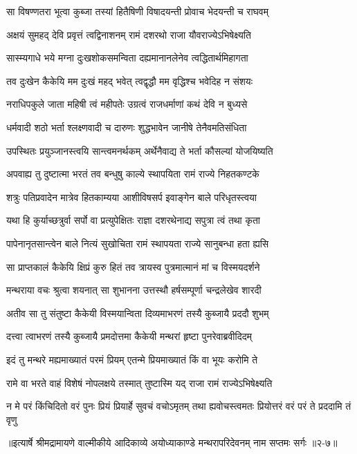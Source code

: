\twolineshloka
{सा विषण्णतरा भूत्वा कुब्जा तस्यां हितैषिणी}
{विषादयन्ती प्रोवाच भेदयन्ती च राघवम्} %

\twolineshloka
{अक्षयं सुमहद् देवि प्रवृत्तं त्वद्विनाशनम्}
{रामं दशरथो राजा यौवराज्येऽभिषेक्ष्यति} %

\twolineshloka
{सास्म्यगाधे भये मग्ना दुःखशोकसमन्विता}
{दह्यमानानलेनेव त्वद्धितार्थमिहागता} %

\twolineshloka
{तव दुःखेन कैकेयि मम दुःखं महद् भवेत्}
{त्वद्वृद्धौ मम वृद्धिश्च भवेदिह न संशयः} %

\twolineshloka
{नराधिपकुले जाता महिषी त्वं महीपतेः}
{उग्रत्वं राजधर्माणां कथं देवि न बुध्यसे} %

\twolineshloka
{धर्मवादी शठो भर्ता श्लक्ष्णवादी च दारुणः}
{शुद्धभावेन जानीषे तेनैवमतिसंधिता} %

\twolineshloka
{उपस्थितः प्रयुञ्जानस्त्वयि सान्त्वमनर्थकम्}
{अर्थेनैवाद्य ते भर्ता कौसल्यां योजयिष्यति} %

\twolineshloka
{अपवाह्य तु दुष्टात्मा भरतं तव बन्धुषु}
{काल्ये स्थापयिता रामं राज्ये निहतकण्टके} %

\twolineshloka
{शत्रुः पतिप्रवादेन मात्रेव हितकाम्यया}
{आशीविषसर्प इवाङ्गेन बाले परिधृतस्त्वया} %

\twolineshloka
{यथा हि कुर्याच्छत्रुर्वा सर्पो वा प्रत्युपेक्षितः}
{राज्ञा दशरथेनाद्य सपुत्रा त्वं तथा कृता} %

\twolineshloka
{पापेनानृतसान्त्वेन बाले नित्यं सुखोचिता}
{रामं स्थापयता राज्ये सानुबन्धा हता ह्यसि} %

\twolineshloka
{सा प्राप्तकालं कैकेयि क्षिप्रं कुरु हितं तव}
{त्रायस्व पुत्रमात्मानं मां च विस्मयदर्शने} %

\twolineshloka
{मन्थराया वचः श्रुत्वा शयनात् सा शुभानना}
{उत्तस्थौ हर्षसम्पूर्णा चन्द्रलेखेव शारदी} %

\twolineshloka
{अतीव सा तु संतुष्टा कैकेयी विस्मयान्विता}
{दिव्यमाभरणं तस्यै कुब्जायै प्रददौ शुभम्} %

\twolineshloka
{दत्त्वा त्वाभरणं तस्यै कुब्जायै प्रमदोत्तमा}
{कैकेयी मन्थरां हृष्टा पुनरेवाब्रवीदिदम्} %

\twolineshloka
{इदं तु मन्थरे मह्यमाख्यातं परमं प्रियम्}
{एतन्मे प्रियमाख्यातं किं वा भूयः करोमि ते} %

\twolineshloka
{रामे वा भरते वाहं विशेषं नोपलक्षये}
{तस्मात् तुष्टास्मि यद् राजा रामं राज्येऽभिषेक्ष्यति} %

\twolineshloka
{न मे परं किंचिदितो वरं पुनः प्रियं प्रियार्हे सुवचं वचोऽमृतम्}
{तथा ह्यवोचस्त्वमतः प्रियोत्तरं वरं परं ते प्रददामि तं वृणु} %


॥इत्यार्षे श्रीमद्रामायणे वाल्मीकीये आदिकाव्ये अयोध्याकाण्डे मन्थरापरिदेवनम् नाम सप्तमः सर्गः ॥२-७॥

